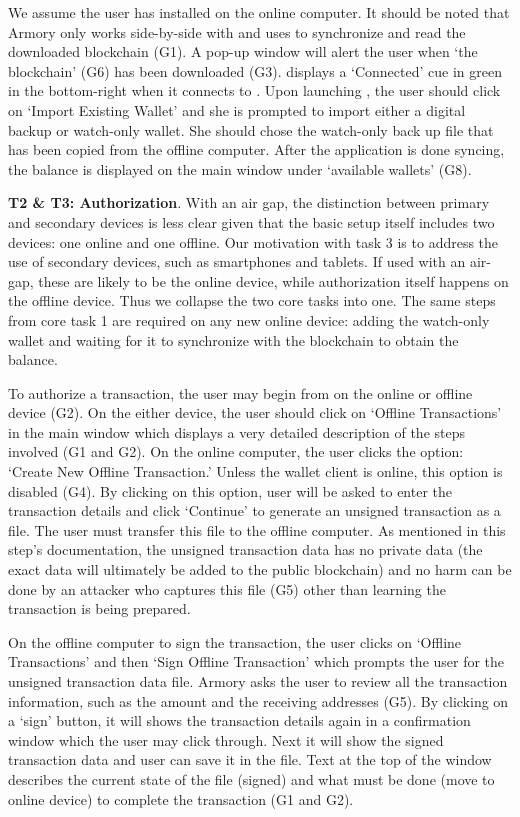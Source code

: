 We assume the user has installed \armory on the online computer. It should be noted that Armory only works side-by-side with \bitcoinclient and uses \bitcoinclient to synchronize and read the downloaded blockchain (G1). A pop-up window will alert the user when `the blockchain' (G6) has been downloaded (G3). \armory displays a `Connected' cue in green in the bottom-right when it connects to \bitcoinclient. Upon launching \armory, the user should click on `Import Existing Wallet' and she is prompted to import either a digital backup or watch-only wallet. She should chose the watch-only back up file that has been copied from the offline computer. After the application is done syncing, the balance is displayed on the main window under `available wallets' (G8).

\textbf{T2 \& T3: Authorization}.
With an air gap, the distinction between primary and secondary devices is less clear given that the basic setup itself includes two devices: one online and one offline. Our motivation with task 3 is to address the use of secondary devices, such as smartphones and tablets. If used with an air-gap, these are likely to be the online device, while authorization itself happens on the offline device. Thus we collapse the two core tasks into one. The same steps from core task 1 are required on any new online device: adding the watch-only wallet and waiting for it to synchronize with the blockchain to obtain the balance.

To authorize a transaction, the user may begin from \armory on the online or offline device (G2). On the either device, the user should click on `Offline Transactions' in the main window which displays a very detailed description of the steps involved (G1 and G2). On the online computer, the user clicks the option: `Create New Offline Transaction.' Unless the wallet client is online, this option is disabled (G4). By clicking on this option, user will be asked to enter the transaction details and click `Continue' to generate an unsigned transaction as a file. The user must transfer this file to the offline computer. As mentioned in this step's documentation, the unsigned transaction data has no private data (the exact data will ultimately be added to the public blockchain) and no harm can be done by an attacker who captures this file (G5) other than learning the transaction is being prepared.

On the offline computer to sign the transaction, the user clicks on `Offline Transactions' and then `Sign Offline Transaction' which prompts the user for the unsigned transaction data file. Armory asks the user to review all the transaction information, such as the amount and the receiving addresses (G5). By clicking on a `sign' button, it will shows the transaction details again in a confirmation window which the user may click through. Next it will show the signed transaction data and user can save it in the file. Text at the top of the window describes the current state of the file (signed) and what must be done (move to online device) to complete the transaction (G1 and G2).

